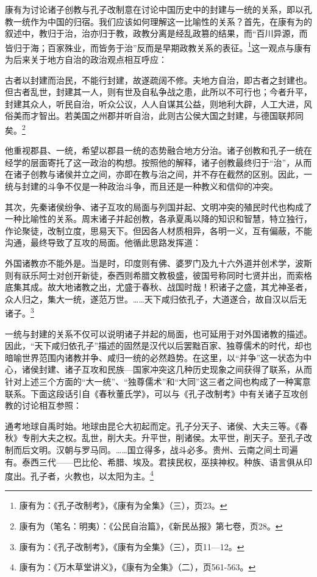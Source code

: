 \documentclass[a4paper, 12pt, openright]{ctexbook}
\renewenvironment{quote}
  {\list{}{\rightmargin2\ccwd \leftmargin2\ccwd \itemindent=2\ccwd \listparindent=2\ccwd}%
   \item\relax\small\kaishu\color{black}}
  {\endlist}
\begin{document}
康有为讨论诸子创教与孔子改制意在讨论中国历史中的封建与一统的关系，即以孔教一统作为中国的归宿。我们应该如何理解这一比喻性的关系？首先，在康有为的叙述中，教归于治，治亦归于教，政教分离是经乱政篡的结果，而“百川异源，而皆归于海；百家殊业，而皆务于治”反而是早期政教关系的表征。\footnote{康有为：《孔子改制考》，《康有为全集》（三），页23。}这一观点与康有为后来关于地方自治的政治观点相互呼应：

\begin{quote}
古者以封建而治民，不能行封建，故遂疏阔不修。夫地方自治，即古者之封建也。但古者乱世，封建其一人，则有世及自私争战之患，此所以不可行也；今者升平，封建其众人，听民自治，听众公议，人人自谋其公益，则地利大辟，人工大进，风俗美而才智出。若美国之州郡并听自治，此则古公侯大国之封建，与德国联邦同矣。\footnote{康有为（笔名：明夷）：《公民自治篇》，《新民丛报》第七卷，页28。}
\end{quote}

他重视郡县、一统，希望以郡县一统的态势融合地方分治。诸子创教和孔子一统在经学的层面寄托了这一政治的构想。按照他的解释，诸子创教最终归于“治”，从而在诸子创教与诸侯并立之间，亦即在教与治之间，并不存在截然的区别。因此，一统与封建的斗争不仅是一种政治斗争，而且还是一种教义和信仰的冲突。

其次，先秦诸侯纷争、诸子互攻的局面与列国并起、文明冲突的殖民时代也构成了一种比喻性的关系。周末诸子并起创教，各承夏禹以降的知识和智慧，特立独行，作论聚徒，改制立度，思易天下。但因各人材质相异，各明一义，互有偏蔽，不能沟通，最终导致了互攻的局面。他循此思路发挥道：

\begin{quote}
外国诸教亦不能外是。当是时，印度则有佛、婆罗门及九十六外道并创术学，波斯则有祆乐阿士对创开新徒，泰西则希腊文教极盛，彼国号称同时七贤并出，而索格底集其成。故大地诸教之出，尤盛于春秋、战国时哉！积诸子之盛，其尤神圣者，众人归之，集大一统，遂范万世。……天下咸归依孔子，大道遂合，故自汉以后无诸子。\footnote{康有为：《孔子改制考》，《康有为全集》（三），页11—12。}
\end{quote}

一统与封建的关系不仅可以说明诸子并起的局面，也可延用于对外国诸教的描述。因此，“天下咸归依孔子”描述的固然是汉代以后罢黜百家、独尊儒术的时代，却也暗喻世界范围内诸教并争、咸归一统的必然趋势。在这里，以“并争”这一状态为中心，诸侯封建、诸子互攻和民族—国家冲突这几种历史现象之间获得了联系，从而针对上述三个方面的“大一统”、“独尊儒术”和“大同”这三者之间也构成了一种寓意联系。下面这段话引自《春秋董氏学》，可以与《孔子改制考》中有关诸子互攻创教的讨论相互参照：

\begin{quote}
通考地球自禹时始。地球由昆仑大初起而定。孔子分天子、诸侯、大夫三等。《春秋》专削大夫之权。乱世，削大夫。升平世，削诸侯。太平世，削天子。至孔子改制而后文明。汉朝与罗马同。……国立得多，战斗必多。贵州、云南之间土司遍有。泰西三代——巴比伦、希腊、埃及。君挟民权，巫挟神权。种族、语言俱从印度出。孔子者，火教也，以太阳为主。\footnote{康有为：《万木草堂讲义》，《康有为全集》（二），页561-563。}
\end{quote}
\end{document}
